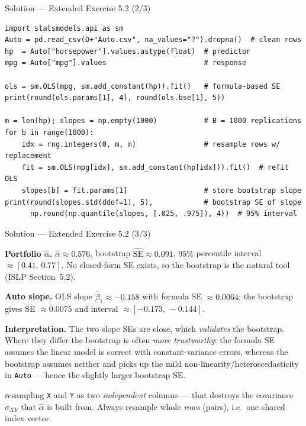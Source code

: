 \documentclass[aspectratio=169,11pt]{beamer}
\begin{document}
\begin{frame}[fragile]{Solution --- Extended Exercise 5.2 (2/3)}
  \begin{lstlisting}
import statsmodels.api as sm
Auto = pd.read_csv(D+"Auto.csv", na_values="?").dropna()  # clean rows
hp  = Auto["horsepower"].values.astype(float)  # predictor
mpg = Auto["mpg"].values                       # response

ols = sm.OLS(mpg, sm.add_constant(hp)).fit()   # formula-based SE
print(round(ols.params[1], 4), round(ols.bse[1], 5))

m = len(hp); slopes = np.empty(1000)           # B = 1000 replications
for b in range(1000):
    idx = rng.integers(0, m, m)                # resample rows w/ replacement
    fit = sm.OLS(mpg[idx], sm.add_constant(hp[idx])).fit()  # refit OLS
    slopes[b] = fit.params[1]                  # store bootstrap slope
print(round(slopes.std(ddof=1), 5),            # bootstrap SE of slope
      np.round(np.quantile(slopes, [.025, .975]), 4))  # 95% interval
  \end{lstlisting}
\end{frame}

\begin{frame}{Solution --- Extended Exercise 5.2 (3/3)}
  \begin{solutionbox}
    \textbf{Portfolio $\hat\alpha$.} $\hat\alpha\approx 0.576$, bootstrap
    $\widehat{\mathrm{SE}}\approx 0.091$, $95\%$ percentile interval
    $\approx[0.41,\,0.77]$. No closed-form SE exists, so the bootstrap is
    the natural tool (ISLP Section~5.2).

    \textbf{Auto slope.} OLS slope $\hat\beta_1\approx -0.158$ with
    formula SE $\approx 0.0064$; the bootstrap gives SE $\approx 0.0075$
    and interval $\approx[-0.173,\,-0.144]$.

    \textbf{Interpretation.} The two slope SEs are close, which
    \emph{validates} the bootstrap. Where they differ the bootstrap is
    often \emph{more trustworthy}: the formula SE assumes the linear
    model is correct with constant-variance errors, whereas the
    bootstrap assumes neither and picks up the mild
    non-linearity/heteroscedasticity in \texttt{Auto} --- hence the
    slightly larger bootstrap SE.
  \end{solutionbox}
  \begin{mistake}
    resampling \texttt{X} and \texttt{Y} as two
    \emph{independent} columns --- that destroys the covariance
    $\hat\sigma_{XY}$ that $\hat\alpha$ is built from. Always resample
    whole \emph{rows} (pairs), i.e.\ one shared index vector.
  \end{mistake}
\end{frame}
\end{document}
